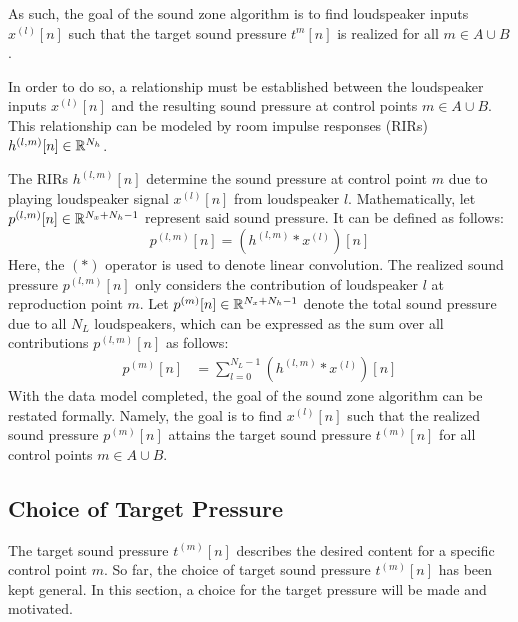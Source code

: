 As such, the goal of the sound zone algorithm is to find loudspeaker inputs $x^{(l)}[n]$ 
such that the target sound pressure $t^{m}[n]$ is realized for all $m\in A \cup B$.

In order to do so, a relationship must be established between the loudspeaker inputs $x^{(l)}[n]$
and the resulting sound pressure at control points $m\in A \cup B$. 
This relationship can be modeled by room impulse responses (RIRs) $h^{(l,m)}[n]\in\mathbb{R}^{N_h}$.

The RIRs $h^{(l,m)}[n]$ determine the sound pressure at control point $m$ due to playing loudspeaker signal $x^{(l)}[n]$ from loudspeaker $l$. 
Mathematically, let $p^{(l,m)}[n]\in\mathbb{R}^{N_x + N_h - 1}$ represent said sound pressure. 
It can be defined as follows:
\begin{equation}
    p^{(l,m)}[n] = \left(h^{(l,m)} \ast x^{(l)}\right)[n]
\end{equation}
Here, the $(\ast)$ operator is used to denote linear convolution. 
The realized sound pressure $p^{(l,m)}[n]$ only considers the contribution of loudspeaker $l$ at reproduction point $m$.
Let $p^{(m)}[n]\in\mathbb{R}^{N_x + N_h - 1}$ denote the total sound pressure due to all $N_L$ loudspeakers,
which can be expressed as the sum over all contributions $p^{(l,m)}[n]$ as follows: 
\begin{align}
    p^{(m)}[n] &= \sum_{l=0}^{N_L - 1} \left(h^{(l,m)} \ast x^{(l)}\right)[n]
\end{align}
With the data model completed, the goal of the sound zone algorithm can be restated formally.
Namely, the goal is to find $x^{(l)}[n]$ such that the realized sound pressure $p^{(m)}[n]$ attains the
target sound pressure $t^{(m)}[n]$ for all control points $m\in A \cup B$.

\subsection{Choice of Target Pressure}
\label{ch:sound_zone:data_model:target_pressure_choice}
The target sound pressure $t^{(m)}[n]$ describes the desired content for a specific control point $m$. 
So far, the choice of target sound pressure $t^{(m)}[n]$ has been kept general. 
In this section, a choice for the target pressure will be made and motivated.

